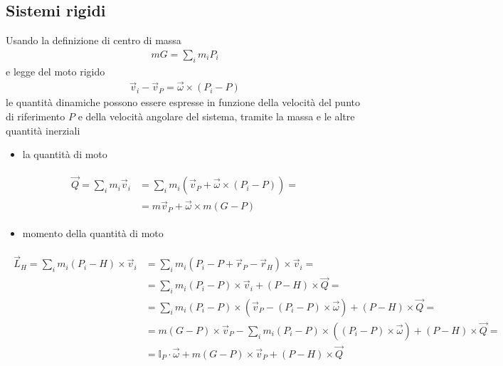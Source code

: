 \documentclass[letterpaper,10pt,italian]{jupyterBook}
\begin{document}
\subsection{Sistemi rigidi}
\label{\detokenize{ch/mechanics/inertia-points:sistemi-rigidi}}
\sphinxAtStartPar
Usando la definizione di centro di massa
\begin{equation*}
\begin{split}m G = \sum_i m_i P_i\end{split}
\end{equation*}
\sphinxAtStartPar
e legge del moto rigido
\begin{equation*}
\begin{split}\vec{v}_i - \vec{v}_P = \vec{\omega} \times (P_i - P)\end{split}
\end{equation*}
\sphinxAtStartPar
le quantità dinamiche possono essere espresse in funzione della velocità del punto di riferimento \(P\) e della velocità angolare del sistema, tramite la massa e le altre quantità inerziali
\begin{itemize}
\item {} 
\sphinxAtStartPar
la quantità di moto

\end{itemize}
\begin{equation*}
\begin{split}\begin{aligned}
  \vec{Q} = \sum_i m_i \vec{v}_i
        & = \sum_i m_i \left( \vec{v}_P + \vec{\omega} \times (P_i - P) \right) = \\
        & =  m \vec{v}_P + \vec{\omega} \times m (G - P) 
\end{aligned}\end{split}
\end{equation*}\begin{itemize}
\item {} 
\sphinxAtStartPar
momento della quantità di moto

\end{itemize}
\begin{equation*}
\begin{split}\begin{aligned}
  \vec{L}_H = \sum_i m_i (P_i - H) \times \vec{v}_i
        & = \sum_i m_i \left( P_i - P + \vec{r}_P - \vec{r}_H \right) \times \vec{v}_i = \\
        & = \sum_i m_i \left( P_i - P \right) \times \vec{v}_i + \left( P - H \right) \times \vec{Q}  = \\
        & = \sum_i m_i \left( P_i - P \right) \times \left( \vec{v}_P - \left( P_i - P \right) \times \vec{\omega} \right) + \left( P - H \right) \times \vec{Q}  = \\
        & = m (G - P) \times \vec{v}_P - \sum_i m_i \left( P_i - P \right) \times \left( \left( P_i - P \right) \times \vec{\omega} \right) + \left( P - H \right) \times \vec{Q}  = \\
        & = \mathbb{I}_P \cdot \vec{\omega} +  m (G - P) \times \vec{v}_P + \left( P - H \right) \times \vec{Q}
\end{aligned}\end{split}
\end{equation*}
\end{document}
